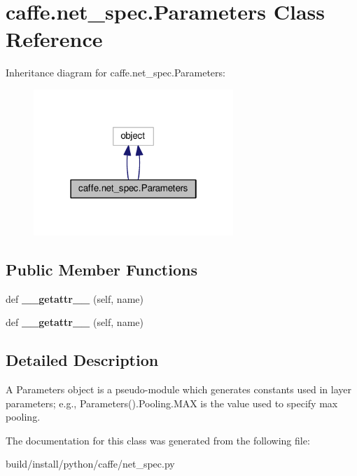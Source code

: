 \hypertarget{classcaffe_1_1net__spec_1_1_parameters}{}\section{caffe.\+net\+\_\+spec.\+Parameters Class Reference}
\label{classcaffe_1_1net__spec_1_1_parameters}


Inheritance diagram for caffe.\+net\+\_\+spec.\+Parameters\+:
\nopagebreak
\begin{figure}[H]
\begin{center}
\leavevmode
\includegraphics[width=214pt]{classcaffe_1_1net__spec_1_1_parameters__inherit__graph}
\end{center}
\end{figure}
\subsection*{Public Member Functions}
\begin{DoxyCompactItemize}
\item 
\mbox{\label{classcaffe_1_1net__spec_1_1_parameters_a043d287f2900307d6b95e49d7388fb16}} 
def {\bfseries \+\_\+\+\_\+getattr\+\_\+\+\_\+} (self, name)
\item 
\mbox{\label{classcaffe_1_1net__spec_1_1_parameters_a043d287f2900307d6b95e49d7388fb16}} 
def {\bfseries \+\_\+\+\_\+getattr\+\_\+\+\_\+} (self, name)
\end{DoxyCompactItemize}


\subsection{Detailed Description}
\begin{DoxyVerb}A Parameters object is a pseudo-module which generates constants used
in layer parameters; e.g., Parameters().Pooling.MAX is the value used
to specify max pooling.\end{DoxyVerb}
 

The documentation for this class was generated from the following file\+:\begin{DoxyCompactItemize}
\item 
build/install/python/caffe/net\+\_\+spec.\+py\end{DoxyCompactItemize}
